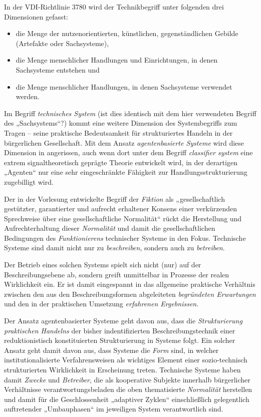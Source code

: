\documentclass[11pt,a4paper]{article}
\begin{document}
In der VDI-Richtlinie 3780 wird der Technikbegriff unter folgenden drei
Dimensionen gefasst: 
\begin{itemize}[noitemsep]
\item die Menge der nutzenorientierten, künstlichen, gegenständlichen Gebilde
  (Artefakte oder Sachsysteme),
\item die Menge menschlicher Handlungen und Einrichtungen, in denen
  Sachsysteme entstehen und
\item die Menge menschlicher Handlungen, in denen Sachsysteme verwendet
  werden.
\end{itemize}

Im Begriff \emph{technisches System} (ist dies identisch mit dem hier
verwendeten Begriff des „Sachsystems“?) kommt eine weitere Dimension des
Systembegriffs zum Tragen -- seine praktische Bedeutsamkeit für strukturiertes
Handeln in der bürgerlichen Gesellschaft. Mit dem Ansatz \emph{agentenbasierte
  Systeme} wird diese Dimension in \cite{Holland2006} angerissen, auch wenn
dort unter dem Begriff \emph{classifier system} eine extrem signaltheoretisch
geprägte Theorie entwickelt wird, in der derartigen „Agenten“ nur eine sehr
eingeschränkte Fähigkeit zur Handlungsstrukturierung zugebilligt wird.

Der in der Vorlesung entwickelte Begriff der \emph{Fiktion} als
„gesellschaftlich gestützter, garantierter und aufrecht erhaltener Konsens
einer verkürzenden Sprechweise über eine gesellschaftliche Normalität“ rückt
die Herstellung und Aufrechterhaltung dieser \emph{Normalität} und damit die
gesellschaftlichen Bedingungen des \emph{Funktionierens} technischer Systeme
in den Fokus. Technische Systeme sind damit nicht nur zu \emph{beschreiben},
sondern auch zu \emph{betreiben}.

Der Betrieb eines solchen Systems spielt sich nicht (nur) auf der
Beschreibungsebene ab, sondern greift unmittelbar in Prozesse der realen
Wirklichkeit ein. Er ist damit eingespannt in das allgemeine praktische
Verhältnis zwischen den aus den Beschreibungsformen abgeleiteten
\emph{begründeten Erwartungen} und den in der praktischen Umsetzung
\emph{erfahrenen Ergebnissen}.

Der Ansatz agentenbasierter Systeme geht davon aus, dass die
\emph{Strukturierung praktischen Handelns} der bisher indentifizierten
Beschreibungstechnik einer reduktionistisch konstituierten Strukturierung in
Systeme folgt. Ein solcher Ansatz geht damit davon aus, dass Systeme die
\emph{Form} sind, in welcher institutionalisierte Verfahrensweisen als
wichtiges Element einer sozio-technisch strukturierten Wirklichkeit in
Erscheinung treten. Technische Systeme haben damit \emph{Zwecke} und
\emph{Betreiber}, die als kooperative Subjekte innerhalb bürgerlicher
Verhältnisse verantwortungsbeladen die oben thematisierte \emph{Normalität}
herstellen und damit für die Geschlossenheit „adaptiver Zyklen“ einschließlich
gelegentlich auftretender „Umbauphasen“ im jeweiligen System verantwortlich
sind.
\end{document}
